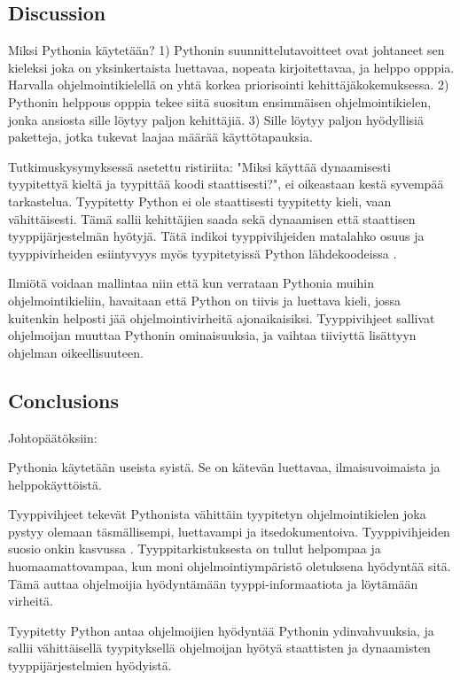 \begin{otherlanguage}{finnish}
\chapter*{Discussion}
Miksi Pythonia käytetään? 1) Pythonin suunnittelutavoitteet ovat johtaneet sen kieleksi joka on yksinkertaista luettavaa, nopeata kirjoitettavaa, ja helppo opppia. Harvalla ohjelmointikielellä on yhtä korkea priorisointi kehittäjäkokemuksessa. 2) Pythonin helppous opppia tekee siitä suositun ensimmäisen ohjelmointikielen, jonka ansiosta sille löytyy paljon kehittäjiä. 3) Sille löytyy paljon hyödyllisiä paketteja, jotka tukevat laajaa määrää käyttötapauksia.

Tutkimuskysymyksessä asetettu ristiriita: "Miksi käyttää dynaamisesti tyypitettyä kieltä ja tyypittää koodi staattisesti?", ei oikeastaan kestä syvempää tarkastelua. Tyypitetty Python ei ole staattisesti tyypitetty kieli, vaan vähittäisesti. Tämä sallii kehittäjien saada sekä dynaamisen että staattisen tyyppijärjestelmän hyötyjä. Tätä indikoi tyyppivihjeiden matalahko osuus ja tyyppivirheiden esiintyvyys myös tyypitetyissä Python lähdekoodeissa \cite{di_grazia_evolution_2022, rak-amnouykit_taleoftwo_2020}.

Ilmiötä voidaan mallintaa niin että kun verrataan Pythonia muihin ohjelmointikieliin, havaitaan että Python on tiivis ja luettava kieli, jossa kuitenkin helposti jää ohjelmointivirheitä ajonaikaisiksi. Tyyppivihjeet sallivat ohjelmoijan muuttaa Pythonin ominaisuuksia, ja vaihtaa tiiviyttä lisättyyn ohjelman oikeellisuuteen.

\section*{Conclusions}
Johtopäätöksiin:

Pythonia käytetään useista syistä. Se on kätevän luettavaa, ilmaisuvoimaista ja helppokäyttöistä.

Tyyppivihjeet tekevät Pythonista vähittäin tyypitetyn ohjelmointikielen joka pystyy olemaan täsmällisempi, luettavampi ja itsedokumentoiva. Tyyppivihjeiden suosio onkin kasvussa \cite{jin_where_to_start_2021, khan_empirical_2022}. Tyyppitarkistuksesta on tullut helpompaa ja huomaamattovampaa, kun moni ohjelmointiympäristö oletuksena hyödyntää sitä. Tämä auttaa ohjelmoijia hyödyntämään tyyppi-informaatiota ja löytämään virheitä.

Tyypitetty Python antaa ohjelmoijien hyödyntää Pythonin ydinvahvuuksia, ja sallii vähittäisellä tyypityksellä ohjelmoijan hyötyä staattisten ja dynaamisten tyyppijärjestelmien hyödyistä.


\end{otherlanguage}
